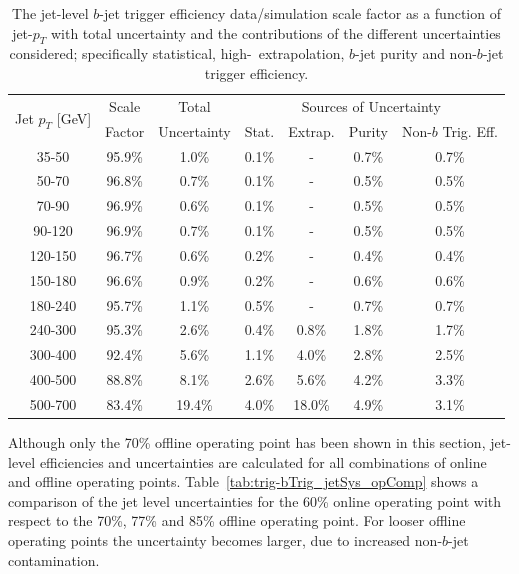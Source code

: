 \begin{table}[!ht]
  \begin{tabular}{|c||c|c||c|c|c|c|}
    \hline
    \multirow{2}{*}{Jet $p_T$ [GeV]} & Scale  & Total       & \multicolumn{4}{c|}{Sources of Uncertainty} \\ \cline{4-7} 
                                     & Factor & Uncertainty & Stat.  & Extrap.  & Purity  & Non-$b$ Trig. Eff. \\
    \hline
    35-50   & 95.9\% & 1.0\% & 0.1\% & - & 0.7\% & 0.7\% \\
    50-70   & 96.8\% & 0.7\% & 0.1\% & - & 0.5\% & 0.5\% \\
    70-90   & 96.9\% & 0.6\% & 0.1\% & - & 0.5\% & 0.5\% \\
    90-120  & 96.9\% & 0.7\% & 0.1\% & - & 0.5\% & 0.5\% \\
    120-150 & 96.7\% & 0.6\% & 0.2\% & - & 0.4\% & 0.4\% \\
    150-180 & 96.6\% & 0.9\% & 0.2\% & - & 0.6\% & 0.6\% \\
    180-240 & 95.7\% & 1.1\% & 0.5\% & - & 0.7\% & 0.7\% \\
    \hline
    240-300 & 95.3\% & 2.6\% & 0.4\% & 0.8\% & 1.8\% & 1.7\% \\
    300-400 & 92.4\% & 5.6\% & 1.1\% & 4.0\% & 2.8\% & 2.5\% \\
    400-500 & 88.8\% & 8.1\% & 2.6\% & 5.6\% & 4.2\% & 3.3\% \\
    500-700 & 83.4\% & 19.4\% & 4.0\% & 18.0\% & 4.9\% & 3.1\% \\
    \hline
\end{tabular}
  \caption[The jet-level $b$-jet trigger efficiency data/simulation scale factor  as a function of jet-$p_{T}$ with total uncertainties and the contributions]
          {The jet-level $b$-jet trigger efficiency data/simulation scale factor as a function of jet-$p_{T}$
    with total uncertainty and the contributions of the different uncertainties considered;
    specifically statistical, high-\pT~extrapolation, $b$-jet purity and non-$b$-jet trigger efficiency.}
\label{tab:bTrig_jetSys}
\end{table}

Although only the 70\% offline operating point has been shown in this section,
jet-level efficiencies and uncertainties are calculated for all combinations of online and offline operating points.
Table~\ref{tab:trig-bTrig_jetSys_opComp} shows a comparison of the jet level uncertainties for the 60\% online operating point with respect to the 70\%, 77\% and 85\% offline operating point.
For looser offline operating points the uncertainty becomes larger, due to increased non-$b$-jet contamination.

